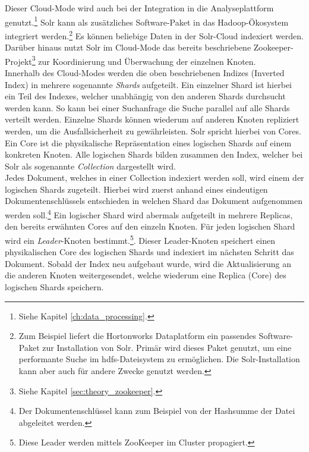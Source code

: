 \noindent
Dieser Cloud-Mode wird auch bei der Integration in die Analyseplattform genutzt.\footnote{Siehe Kapitel \ref{ch:data_processing}.} Solr kann als zusätzliches Software-Paket in das Hadoop-Ökosystem integriert werden.\footnote{Zum Beispiel liefert die Hortonworks Dataplatform ein passendes Software-Paket zur Installation von Solr. Primär wird dieses Paket genutzt, um eine performante Suche im \gls{hdfs}-Dateisystem zu ermöglichen. Die Solr-Installation kann aber auch für andere Zwecke genutzt werden.} Es können beliebige Daten in der Solr-Cloud indexiert werden. Darüber hinaus nutzt Solr im Cloud-Mode das bereits beschriebene Zookeeper-Projekt\footnote{Siehe Kapitel \ref{sec:theory_zookeeper}.} zur Koordinierung und Überwachung der einzelnen Knoten.\\
Innerhalb des Cloud-Modes werden die oben beschriebenen Indizes (Inverted Index) in mehrere sogenannte \textit{Shards} aufgeteilt. Ein einzelner Shard ist hierbei ein Teil des Indexes, welcher unabhängig von den anderen Shards durchsucht werden kann. So kann bei einer Suchanfrage die Suche parallel auf alle Shards verteilt werden. Einzelne Shards können wiederum auf anderen Knoten repliziert werden, um die Ausfallsicherheit zu gewährleisten. Solr spricht hierbei von Cores. Ein Core ist die physikalische Repräsentation eines logischen Shards auf einem konkreten Knoten. Alle logischen Shards bilden zusammen den Index, welcher bei Solr als sogenannte \textit{Collection} dargestellt wird.\cite{solr_cloud_scaling}\\

\noindent
Jedes Dokument, welches in einer Collection indexiert werden soll, wird einem der logischen Shards zugeteilt. Hierbei wird zuerst anhand eines eindeutigen Dokumentenschlüssels entschieden in welchen Shard das Dokument aufgenommen werden soll.\footnote{Der Dokumentenschlüssel kann zum Beispiel von der Hashsumme der Datei abgeleitet werden.} Ein logischer Shard wird abermals aufgeteilt in mehrere Replicas, den bereits erwähnten Cores auf den einzeln Knoten. Für jeden logischen Shard wird ein \textit{Leader}-Knoten bestimmt.\footnote{Diese Leader werden mittels ZooKeeper im Cluster propagiert.}. Dieser Leader-Knoten speichert einen physikalischen Core des logischen Shards und indexiert im nächsten Schritt das Dokument. Sobald der Index neu aufgebaut wurde, wird die Aktualisierung an die anderen Knoten weitergesendet, welche wiederum eine Replica (Core) des logischen Shards speichern.\cite[S. 867 ff]{solr_ref_guide}\\ 


